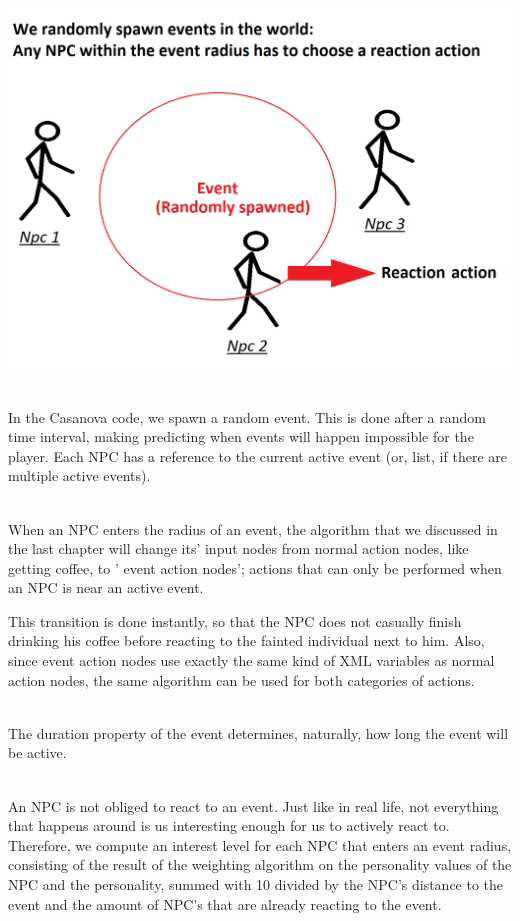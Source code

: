 \documentclass[11pt]{article} %
\begin{document}
~\\
\includegraphics[scale=0.4]{Event}

~\\
In the Casanova code, we spawn a random event. This is done after a random time interval, making predicting when events will happen impossible for the player. Each NPC has a reference to the current active event (or, list, if there are multiple active events).

~\\
When an NPC enters the radius of an event, the algorithm that we discussed in the last chapter will change its' input nodes from normal action nodes, like getting coffee, to ' event action nodes'; actions that can only be performed when an NPC is near an active event.



\newpage
This transition is done instantly, so that the NPC does not casually finish drinking his coffee before reacting to the fainted individual next to him. Also, since event action nodes use exactly the same kind of XML variables as normal action nodes, the same algorithm can be used for both categories of actions. 

~\\
The duration property of the event determines, naturally, how long the event will be active.

~\\
An NPC is not obliged to react to an event. Just like in real life, not everything that happens around is us interesting enough for us to actively react to. Therefore, we compute an interest level for each NPC that enters an event radius, consisting of the result of the weighting algorithm on the personality values of the NPC and the personality, summed with 10 divided by the NPC's distance to the event and the amount of NPC's that are already reacting to the event.
\end{document}
